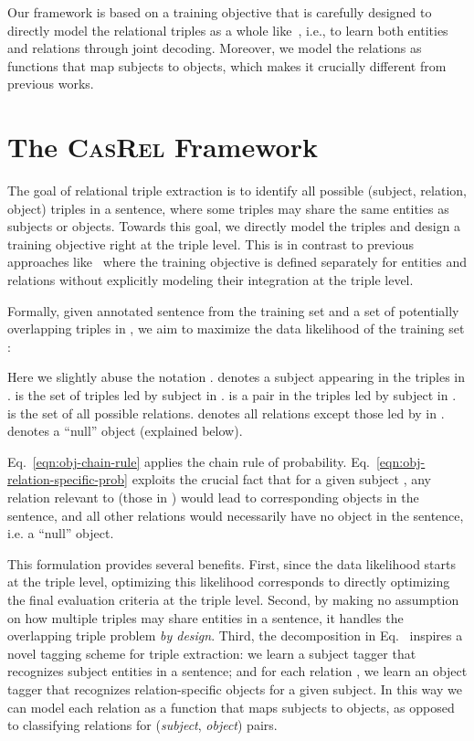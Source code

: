 \documentclass[11pt,a4paper]{article}
\begin{document}
\par Our framework is based on a training objective that is carefully designed to directly model the relational triples as a whole like~\cite{zheng2017Joint}, i.e., to learn both entities and relations through joint decoding. Moreover, we model the relations as functions that map subjects to objects, which makes it crucially different from previous works. 	
	\section{The \textsc{CasRel} Framework}
The goal of relational triple extraction is to identify all possible ({subject}, {relation}, {object}) triples in a sentence, where some triples may share the same entities as subjects or objects. Towards this goal, we directly model the triples and design a training objective right at the triple level. This is in contrast to previous approaches like~\citep{fu2019GraphRel} where the training objective is defined separately for entities and relations without explicitly modeling their integration at the triple level.

\par Formally, given annotated sentence  from the training set  and a set of potentially overlapping triples  in , we aim to maximize the data likelihood of the training set :

\begin{small}

\end{small}Here we slightly abuse the notation .  denotes a subject appearing in the triples in .  is the set of triples led by subject  in .  is a  pair in the triples led by subject  in .  is the set of all possible relations.  denotes all relations except those led by  in .  denotes a ``null'' object (explained below). 

\par Eq.~\eqref{eqn:obj-chain-rule} applies the chain rule of probability.
Eq.~\eqref{eqn:obj-relation-specific-prob} exploits the crucial fact that for a given subject , any relation relevant to  (those in ) would lead to corresponding objects in the sentence, and all other relations would necessarily have no object in the sentence, {i.e.} a ``null'' object.

\par This formulation provides several benefits. First, since the data likelihood starts at the triple level, optimizing this likelihood corresponds to directly optimizing the final evaluation criteria at the triple level. Second, by making no assumption on how multiple triples may share entities in a sentence, it handles the overlapping triple problem \emph{by design}. Third, the decomposition in Eq.~ inspires a novel tagging scheme for triple extraction: we learn a subject tagger  that recognizes subject entities in a sentence; and for each relation , we learn an object tagger   that recognizes relation-specific objects for a given subject. In this way we can model each relation as a function that maps subjects to objects, as opposed to classifying relations for (\emph{subject}, \emph{object}) pairs.
\end{document}
